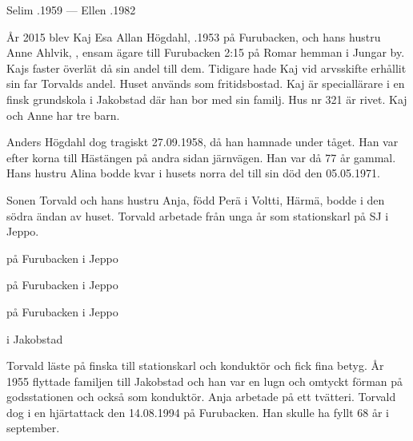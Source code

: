 Selim .1959  ---  Ellen .1982




År 2015 blev Kaj Esa Allan Högdahl, .1953 på Furubacken, och hans hustru Anne Ahlvik, , ensam ägare till Furubacken	2:15 på Romar hemman i Jungar by. Kajs faster  överlät då sin andel till dem. Tidigare hade Kaj vid arvsskifte erhållit sin far Torvalds andel. Huset används som fritidsbostad. Kaj är speciallärare i en finsk grundskola i Jakobstad där han bor med sin familj. Hus nr 321 är rivet. Kaj och Anne har tre barn.
\begin{jhchildren}
  \item {}
  \item {}
  \item {}
\end{jhchildren}


Anders Högdahl dog tragiskt 27.09.1958, då han hamnade under tåget.	Han var efter korna till Hästängen på andra sidan järnvägen. Han var då 77 år gammal. Hans hustru Alina bodde kvar i husets norra del till sin död den 05.05.1971.

Sonen Torvald och hans hustru Anja, född Perä  i Voltti, Härmä, bodde i den södra ändan av huset. Torvald arbetade från unga år som	stationskarl på SJ i Jeppo.
\begin{jhchildren}
  \item {} på Furubacken i Jeppo
  \item {} på Furubacken i Jeppo
  \item {} på Furubacken i Jeppo
  \item {} i Jakobstad
\end{jhchildren}

Torvald läste på finska till stationskarl och konduktör och fick fina betyg. År 1955 flyttade familjen till Jakobstad och han var en lugn och omtyckt förman på godsstationen och också som konduktör. Anja arbetade på ett tvätteri. Torvald dog i en hjärtattack den 14.08.1994 på	Furubacken. Han skulle ha fyllt 68 år i september.

